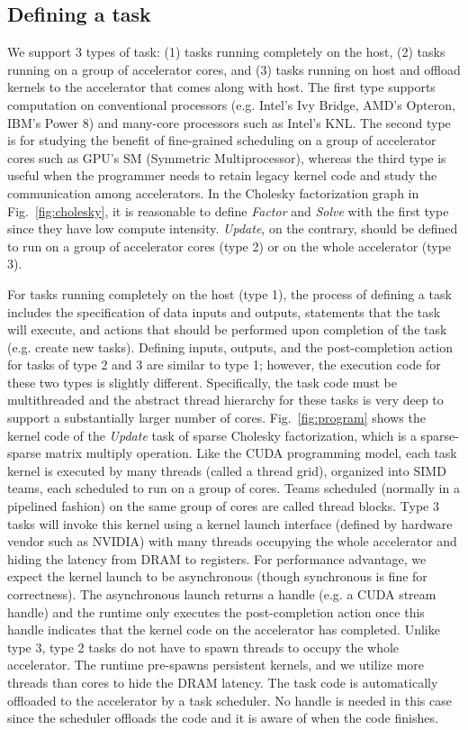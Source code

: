 \subsection{Defining a task}
\label{sec:task-def}
We support 3 types of task: (1) tasks running completely on the host, (2) tasks running on a group of accelerator cores, and (3) tasks running on host and offload kernels to the accelerator that comes along with host.
The first type supports computation on conventional processors (e.g. Intel's Ivy Bridge, AMD's Opteron, IBM's Power 8)  and many-core processors such as Intel's KNL.
The second type is for studying the benefit of fine-grained scheduling on a group of accelerator cores such as GPU's SM (Symmetric Multiprocessor), whereas the third type is useful when the programmer needs to retain legacy kernel code and study the communication among accelerators.
In the Cholesky factorization graph in Fig.~\ref{fig:cholesky}, it is reasonable to define {\em Factor} and {\em Solve} with the first type since they have low compute intensity. 
{\em Update}, on the contrary, should be defined to run on a group of accelerator cores (type 2) or on the whole accelerator (type 3).

For tasks running completely on the host (type 1), the process of defining a task includes the specification of data inputs and outputs, statements that the task will execute, and actions that should be performed upon completion of the task (e.g. create new tasks).
Defining inputs, outputs, and the post-completion action for tasks of type 2 and 3 are similar to type 1; however, the execution code for these two types is slightly different.
Specifically, the task code must be multithreaded and the abstract thread hierarchy for these tasks is very deep to support a substantially larger number of cores.
Fig.~\ref{fig:program} shows the kernel code of the {\em Update} task of sparse Cholesky factorization, which is a sparse-sparse matrix multiply operation.
Like the CUDA programming model, each task kernel is executed by many threads (called a thread grid), organized into SIMD teams, each scheduled to run on a group of cores.
Teams scheduled (normally in a pipelined fashion) on the same group of cores are called thread blocks.
Type 3 tasks will invoke this kernel using a kernel launch interface (defined by hardware vendor such as NVIDIA) with many threads occupying the whole accelerator and hiding the latency from DRAM to registers.
For performance advantage, we expect the kernel launch to be asynchronous (though synchronous is fine for correctness).
The asynchronous launch returns a handle (e.g. a CUDA stream handle) and the runtime only executes the post-completion action once this handle indicates that the kernel code on the accelerator has completed.
Unlike type 3, type 2 tasks do not have to spawn threads to occupy the whole accelerator.
The runtime pre-spawns persistent kernels, and we utilize more threads than cores to hide the DRAM latency.
The task code is automatically offloaded to the accelerator by a task scheduler.
No handle is needed in this case since the scheduler offloads the code and it is aware of when the code finishes.


